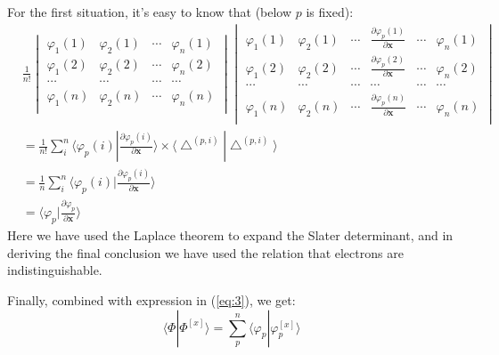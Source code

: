 \documentclass[a4paper,12pt]{article}
\theoremstyle{definition}\newtheorem{law}{Law}
\theoremstyle{plain}\newtheorem{theorem}{Theorem}
\theoremstyle{remark}\newtheorem{remark}{Remark}
\theoremstyle{axiom}\newtheorem{axiom}{Axiom}
\begin{document}
For the first situation, it's easy to know that (below $p$ is fixed):
\begin{align}
 \label{eq:6}
&\frac{1}{n!}
\begin{vmatrix}
   \varphi_{1}(1) & \varphi_{2}(1) & \cdots & \varphi_{n}(1) \\
  \varphi_{1}(2) & \varphi_{2}(2) & \cdots & \varphi_{n}(2) \\
  \cdots & \cdots & \cdots & \cdots                                \\
  \varphi_{1}(n) & \varphi_{2}(n) & \cdots & \varphi_{n}(n) \\
\end{vmatrix}
\begin{vmatrix}
   \varphi_{1}(1) & \varphi_{2}(1) & \cdots & 
  \frac{\partial \varphi_{p}(1)}{\partial \bm{x}} &
   \cdots & \varphi_{n}(1) \\
   \varphi_{1}(2) & \varphi_{2}(2) & \cdots &
   \frac{\partial \varphi_{p}(2)}{\partial \bm{x}} &
   \cdots  & \varphi_{n}(2) \\
   \cdots & \cdots & \cdots & \cdots  & \cdots   & \cdots     \\
   \varphi_{1}(n) & \varphi_{2}(n) & \cdots & 
   \frac{\partial \varphi_{p}(n)}{\partial \bm{x}}  
   &\cdots & \varphi_{n}(n) \\
\end{vmatrix} \nonumber \\
&= \frac{1}{n!}\sum_{i}^{n}\langle\varphi_{p}(i)|\frac{\partial
\varphi_{p}(i)}{\partial \bm{x}}\rangle
\times\langle\bigtriangleup^{(p, i)}|\bigtriangleup^{(p,
i)}\rangle \nonumber \\
&= \frac{1}{n}\sum_{i}^{n}\langle\varphi_{p}(i)|\frac{\partial
\varphi_{p}(i)}{\partial \bm{x}}\rangle \nonumber \\
&=  \langle\varphi_{p}|\frac{\partial
\varphi_{p}}{\partial \bm{x}}\rangle
\end{align}
Here we have used the Laplace theorem to expand the Slater determinant, and 
in deriving the final conclusion we have used the relation that
electrons are indistinguishable.

Finally, combined with expression in (\ref{eq:3}), we get:
\begin{equation}
 \label{eq:7}
\langle\Phi|\Phi^{[x]}\rangle =
\sum_{p}^{n}\langle\varphi_{p}|\varphi^{[x]}_{p}\rangle
\end{equation}
\end{document}
